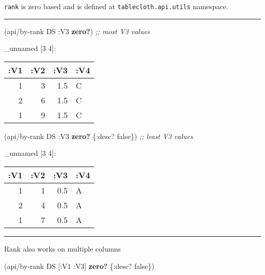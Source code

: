 \documentclass[]{article}
\newenvironment{Shaded}{\begin{snugshade}}{\end{snugshade}}
\newcommand{\KeywordTok}[1]{\textcolor[rgb]{0.13,0.29,0.53}{\textbf{#1}}}
\newcommand{\CommentTok}[1]{\textcolor[rgb]{0.56,0.35,0.01}{\textit{#1}}}
\newcommand{\VariableTok}[1]{\textcolor[rgb]{0.00,0.00,0.00}{#1}}
\newcommand{\AttributeTok}[1]{\textcolor[rgb]{0.77,0.63,0.00}{#1}}
\newcommand{\NormalTok}[1]{#1}
\begin{document}
\texttt{rank} is zero based and is defined at
\texttt{tablecloth.api.utils} namespace.

\begin{center}\rule{0.5\linewidth}{0.5pt}\end{center}

\begin{Shaded}
\begin{Highlighting}[]
\NormalTok{(api/by-rank DS }\AttributeTok{:V3} \KeywordTok{zero?}\NormalTok{) }\CommentTok{;; most V3 values}
\end{Highlighting}
\end{Shaded}

\_unnamed {[}3 4{]}:

\begin{longtable}[]{@{}rrrl@{}}
\toprule
:V1 & :V2 & :V3 & :V4\tabularnewline
\midrule
\endhead
1 & 3 & 1.5 & C\tabularnewline
2 & 6 & 1.5 & C\tabularnewline
1 & 9 & 1.5 & C\tabularnewline
\bottomrule
\end{longtable}

\begin{Shaded}
\begin{Highlighting}[]
\NormalTok{(api/by-rank DS }\AttributeTok{:V3} \KeywordTok{zero?}\NormalTok{ \{}\AttributeTok{:desc}\NormalTok{? }\VariableTok{false}\NormalTok{\}) }\CommentTok{;; least V3 values}
\end{Highlighting}
\end{Shaded}

\_unnamed {[}3 4{]}:

\begin{longtable}[]{@{}rrrl@{}}
\toprule
:V1 & :V2 & :V3 & :V4\tabularnewline
\midrule
\endhead
1 & 1 & 0.5 & A\tabularnewline
2 & 4 & 0.5 & A\tabularnewline
1 & 7 & 0.5 & A\tabularnewline
\bottomrule
\end{longtable}

\begin{center}\rule{0.5\linewidth}{0.5pt}\end{center}

Rank also works on multiple columns

\begin{Shaded}
\begin{Highlighting}[]
\NormalTok{(api/by-rank DS [}\AttributeTok{:V1} \AttributeTok{:V3}\NormalTok{] }\KeywordTok{zero?}\NormalTok{ \{}\AttributeTok{:desc}\NormalTok{? }\VariableTok{false}\NormalTok{\})}
\end{Highlighting}
\end{Shaded}
\end{document}
